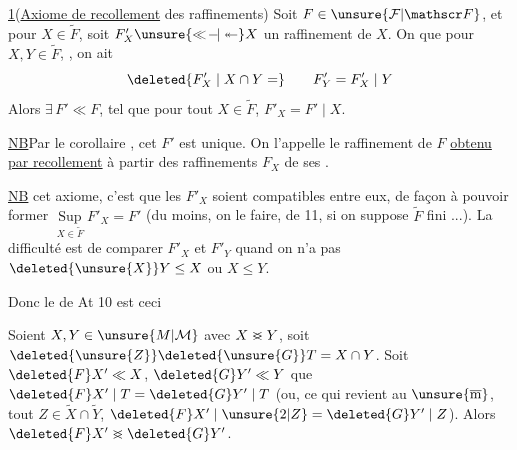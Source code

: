 \uline{ 1}\quad (\uline{Axiome de recollement} des
raffinements) Soit $F\in\unsure{\mathcal F|\mathscr F}$, et pour 
$X\in\widetilde F$, soit $F'_X\unsure{\ll\!-\!|\twoheadleftarrow}X$  un raffinement
de $X$. On  que pour $X,Y\in\widetilde F$,
, on ait
\[
\deleted{F'_X\mid X\cap Y=}\qquad F'_Y=F'_X\mid Y
\]
Alors $\exists\,F'\ll F$, tel que pour tout $X\in\widetilde F$, $F'_X=F'\mid X$.

\uline{NB}\quad Par le corollaire , cet $F'$ est
unique. On l'appelle le raffinement de $F$
\uline{obtenu par recollement} à partir des raffinements
$F_X$ de ses .

\uline{NB}\quad {}
cet axiome, c'est que les $F'_X$ soient
compatibles entre eux, de façon à pouvoir
former $\mathop{\mathrm{Sup}}\limits_{X\in\widetilde F}F'_X=F'$ (du moins, on  le
faire,  de  11, si on suppose
$\widetilde F$ fini ...). La difficulté est de comparer
$F'_X$ et $F'_Y$ quand on n'a pas $\deleted{\unsure{X}}Y\leq X$ ou $X\leq Y$.

Donc le  de At 10 est ceci

\noindent\llap{\smash{\rule[-5.1\baselineskip]{0.4pt}{5.2\baselineskip}}\enspace}\uline{ }\quad Soient $X,Y\in\unsure{M|\mathcal{M}}$ avec $X\mathrel{\rlap{$<$}{>}}Y$, soit
 $\deleted{\unsure{Z}}\deleted{\unsure{G}}T=X\cap Y$. Soit $\deleted{F}X'\ll X$, $\deleted{G}Y'\ll Y$
 que $\deleted{F}X'\mid T=\deleted{G}Y'\mid T$ (ou, ce qui
revient au $\unsure{\overline{\mathrm m}}$,  tout $Z\in\widetilde X\cap\widetilde Y$,
$\deleted{F}X'\mid\unsure{2|Z}=\deleted{G}Y'\mid Z$). Alors $\deleted{F}X'\mathrel{\rlap{$<$}{>}}\deleted{G}Y'$.

